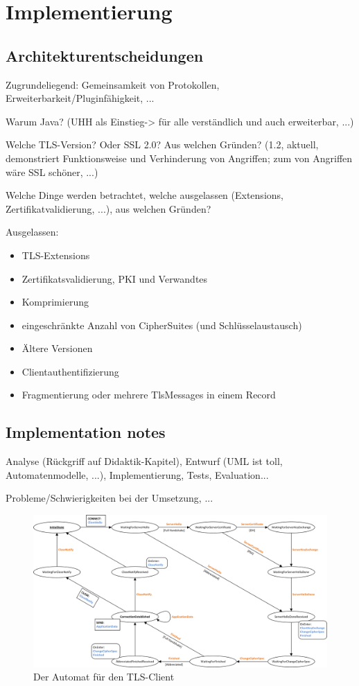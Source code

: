 \chapter{Implementierung}

\section{Architekturentscheidungen}

Zugrundeliegend: Gemeinsamkeit von Protokollen, Erweiterbarkeit/Pluginfähigkeit, ...

Warum Java? (UHH als Einstieg-> für alle verständlich und auch erweiterbar, ...)

Welche TLS-Version? Oder SSL 2.0? Aus welchen Gründen? (1.2, aktuell, demonstriert Funktionsweise und Verhinderung von Angriffen; zum  von Angriffen wäre SSL schöner, ...)

Welche Dinge werden betrachtet, welche ausgelassen (Extensions, Zertifikatvalidierung, ...), aus welchen Gründen?

Ausgelassen:
\begin{itemize}
\item TLS-Extensions
\item Zertifikatsvalidierung, PKI und Verwandtes
\item Komprimierung
\item eingeschränkte Anzahl von CipherSuites (und Schlüsselaustausch)
\item Ältere Versionen
\item Clientauthentifizierung
\item Fragmentierung oder mehrere TlsMessages in einem Record
\end{itemize}

\section{Implementation notes}

Analyse (Rückgriff auf Didaktik-Kapitel), Entwurf (UML ist toll, Automatenmodelle, ...), Implementierung, Tests, Evaluation...

Probleme/Schwierigkeiten bei der Umsetzung, ...

\begin{figure}[H]
	\centering
	\includegraphics[scale=0.75, angle = 90]{Diagrams/client_state_machine.png} %
	\caption{Der Automat für den TLS-Client}
	\label{fig_tls_client_state_machine}
\end{figure}

